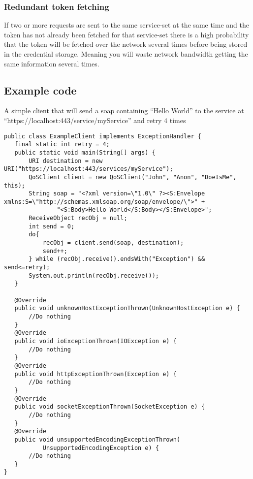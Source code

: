     \subsubsection{Redundant token fetching}
    
    If two or more requests are sent to the same service-set at the same time and the token has not already been fetched for that service-set there is a high probability that the token will be fetched over the network several times before being stored in the credential storage. Meaning you will waste network bandwidth getting the same information several times.

    \subsection{Example code}\label{userguideExample}

    A simple client that will send a soap containing “Hello World” to the service at “https://localhost:443/service/myService” and retry 4 times

\begin{lstlisting}[caption={A simple example client}, label=userguideExampleclient]
public class ExampleClient implements ExceptionHandler {
   final static int retry = 4;
   public static void main(String[] args) {
       URI destination = new URI("https://localhost:443/services/myService");
       QoSClient client = new QoSClient("John", "Anon", "DoeIsMe", this);
       String soap = "<?xml version=\"1.0\" ?><S:Envelope xmlns:S=\"http://schemas.xmlsoap.org/soap/envelope/\">" +
               "<S:Body>Hello World</S:Body></S:Envelope>";
       ReceiveObject recObj = null;
       int send = 0;
       do{
           recObj = client.send(soap, destination);
           send++;
       } while (recObj.receive().endsWith("Exception") && send<=retry);
       System.out.println(recObj.receive());
   }

   @Override
   public void unknownHostExceptionThrown(UnknownHostException e) {
       //Do nothing
   }
   @Override
   public void ioExceptionThrown(IOException e) {
       //Do nothing
   }
   @Override
   public void httpExceptionThrown(Exception e) {
       //Do nothing    
   }
   @Override
   public void socketExceptionThrown(SocketException e) {
       //Do nothing    
   }
   @Override
   public void unsupportedEncodingExceptionThrown(
           UnsupportedEncodingException e) {
       //Do nothing    
   }
}
\end{lstlisting}
